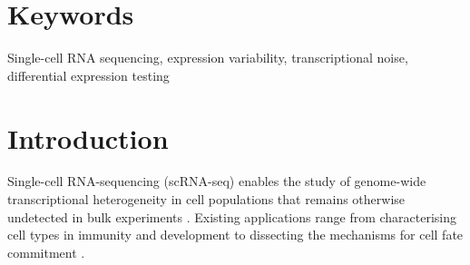 \documentclass[9pt,a4paper,]{extarticle}
\begin{document}
\section*{Keywords}
Single-cell RNA sequencing, expression variability, transcriptional noise, differential expression testing


\clearpage
\pagestyle{main}

\hypertarget{introduction}{%
\section{Introduction}\label{introduction}}

Single-cell RNA-sequencing (scRNA-seq) enables the study of genome-wide
transcriptional heterogeneity in cell populations that remains
otherwise undetected in bulk experiments \citep{Stegle2015, Prakadan2017, Patange2018}. Existing applications range from characterising cell types in
immunity \citep{Lonnberg2017, Villani2017, Zheng2017} and development
\citep{Ibarra-Soria2018, Wagner2018, Pijuan-Sala2019} to dissecting the mechanisms
for cell fate commitment \citep{Goolam2016, Ohnishi2014}.

{\small}
\end{document}
